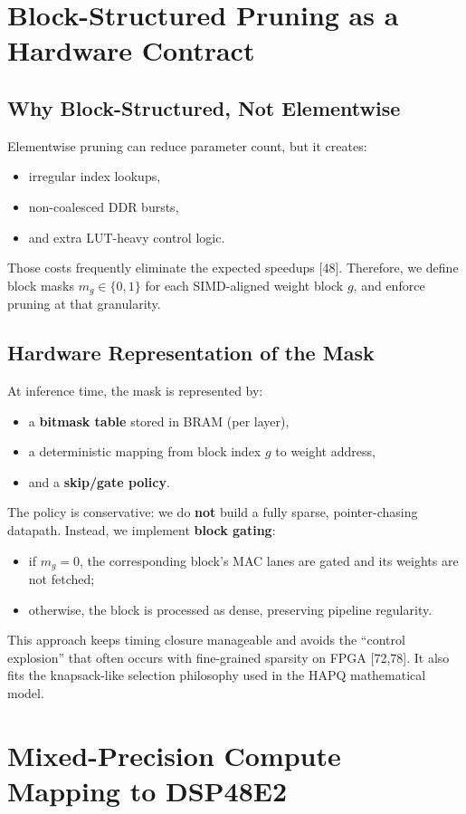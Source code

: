 \documentclass[10pt,journal,compsoc]{IEEEtran}
\begin{document}
\section{Block-Structured Pruning as a Hardware Contract}
\label{sec:pruning}

\subsection{Why Block-Structured, Not Elementwise}
Elementwise pruning can reduce parameter count, but it creates:
\begin{itemize}
    \item irregular index lookups,
    \item non-coalesced DDR bursts,
    \item and extra LUT-heavy control logic.
\end{itemize}
Those costs frequently eliminate the expected speedups [48]. Therefore, we define block masks $m_g \in \{0,1\}$ for each SIMD-aligned weight block $g$, and enforce pruning at that granularity.

\subsection{Hardware Representation of the Mask}
At inference time, the mask is represented by:
\begin{itemize}
    \item a \textbf{bitmask table} stored in BRAM (per layer),
    \item a deterministic mapping from block index $g$ to weight address,
    \item and a \textbf{skip/gate policy}.
\end{itemize}
The policy is conservative: we do \textbf{not} build a fully sparse, pointer-chasing datapath. Instead, we implement \textbf{block gating}:
\begin{itemize}
    \item if $m_g=0$, the corresponding block's MAC lanes are gated and its weights are not fetched;
    \item otherwise, the block is processed as dense, preserving pipeline regularity.
\end{itemize}
This approach keeps timing closure manageable and avoids the ``control explosion'' that often occurs with fine-grained sparsity on FPGA [72,78]. It also fits the knapsack-like selection philosophy used in the HAPQ mathematical model.

\section{Mixed-Precision Compute Mapping to DSP48E2}
\end{document}
